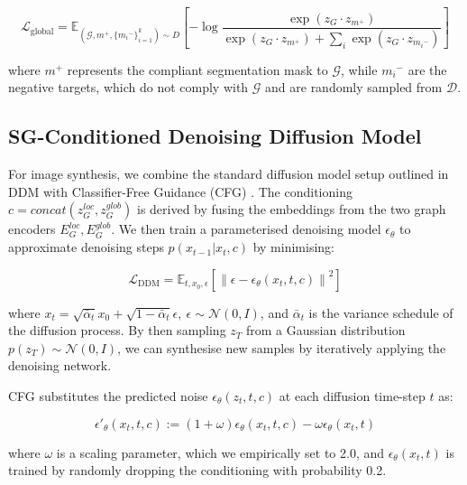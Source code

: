\begin{equation}
    \mathcal{L}_{\text{global}} = \mathbb{E}_{(\mathcal{G}, m^+, \{{m_i}^-\}^k_{i=1}) \sim D} \left[ -\log \frac{\exp \left( z_G \cdot z_{m^+} \right)}{\exp \left( z_G \cdot z_{m^+} \right) + \sum_i \exp \left( z_G \cdot z_{{m_i}^-} \right)} \right]
\end{equation}

where $m^+$ represents the compliant segmentation mask to $\mathcal{G}$, while ${m_i}^-$ are the negative targets, which do not comply with $\mathcal{G}$ and are randomly sampled from $\mathcal{D}$.


\subsection{SG-Conditioned Denoising Diffusion Model}
For image synthesis, we combine the standard diffusion model setup outlined in DDM \cite{ho2020denoising} with Classifier-Free Guidance (CFG) \cite{ho2022classifier}. The conditioning $c = concat(z_G^{loc}, z_G^{glob})$ is derived by fusing the embeddings from the two graph encoders $E_G^{loc}, E_G^{glob}$. We then train a parameterised denoising model $\epsilon_\theta$ to approximate denoising steps $p(x_{t-1} | x_t, c)$ by minimising:

\begin{equation}
    \mathcal{L}_{\text{DDM}} = \mathbb{E}_{t, x_0, \epsilon} \left[ \left\| \epsilon - \epsilon_\theta (x_t, t, c) \right\|^2 \right]
\end{equation}

where $x_t = \sqrt{\bar{\alpha}_t} x_0 + \sqrt{1 - \bar{\alpha}_t} \epsilon, \ \epsilon \sim \mathcal{N}(0, I)$, and $\bar{\alpha}_t$ is the variance schedule of the diffusion process. By then sampling $z_T$ from a Gaussian distribution $p(z_T) \sim \mathcal{N}(0, I)$, we can synthesise new samples by iteratively applying the denoising network. 

CFG substitutes the predicted noise $\epsilon_\theta(z_t, t, c)$ at each diffusion time-step $t$ as:

\begin{equation}
    \epsilon'_\theta(x_t, t, c) := (1 + \omega) \epsilon_\theta(x_t, t, c) - \omega \epsilon_\theta(x_t, t)
\end{equation}

where $\omega$ is a scaling parameter, which we empirically set to 2.0, and $\epsilon_\theta(x_t, t)$ is trained by randomly dropping the conditioning with probability 0.2.